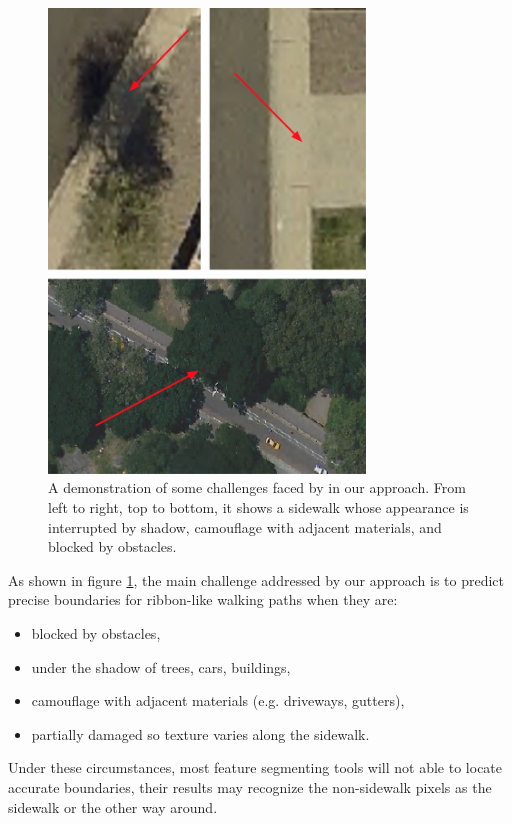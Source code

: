\begin{figure}[H] 
\centering 
\includegraphics[width=0.75\textwidth]{Figures/Challenge.png} 
\caption[Challenges Demonstration]{
A demonstration of some challenges faced by in our approach. From left to right, top to
bottom, it shows 
a sidewalk whose appearance is interrupted by shadow,
camouflage with adjacent materials,
and blocked by obstacles.}
\label{fig:challenge_demo}
\end{figure}

As shown in figure \ref{fig:challenge_demo}, the main challenge addressed by our approach is to predict precise
boundaries for ribbon-like walking paths when they are:

\begin{itemize} 
\item blocked by obstacles, 
\item under the shadow of trees, cars, buildings, 
\item camouflage with adjacent materials (e.g. driveways, gutters),
\item partially damaged so texture varies along the sidewalk.
\end{itemize}

Under these circumstances, most feature segmenting tools will not able to locate accurate boundaries, their results may
recognize the non-sidewalk pixels as the sidewalk or the other way around.

